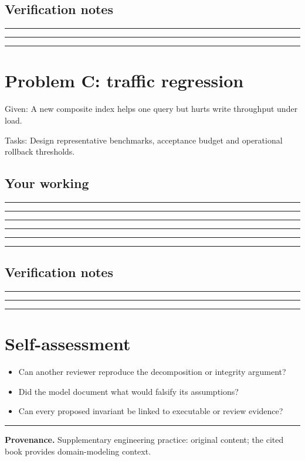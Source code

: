 \documentclass[11pt,letterpaper]{article}
\newcommand{\ResponseLine}{\par\vspace{1.05em}\noindent\rule{\linewidth}{0.4pt}\par}
\newcommand{\ResponseArea}{\ResponseLine\ResponseLine\ResponseLine}
\begin{document}
\subsection{Verification notes}
\ResponseArea

\section{Problem C: traffic regression}
Given: A new composite index helps one query but hurts write throughput under load.

Tasks: Design representative benchmarks, acceptance budget and operational rollback thresholds.

\subsection{Your working}
\ResponseArea\ResponseArea
\subsection{Verification notes}
\ResponseArea

\section{Self-assessment}
\begin{itemize}
\item Can another reviewer reproduce the decomposition or integrity argument?
\item Did the model document what would falsify its assumptions?
\item Can every proposed invariant be linked to executable or review evidence?
\end{itemize}

\vfill
\hrule
{\footnotesize\textbf{Provenance.} Supplementary engineering practice: original content; the cited book provides domain-modeling context.}
\end{document}
